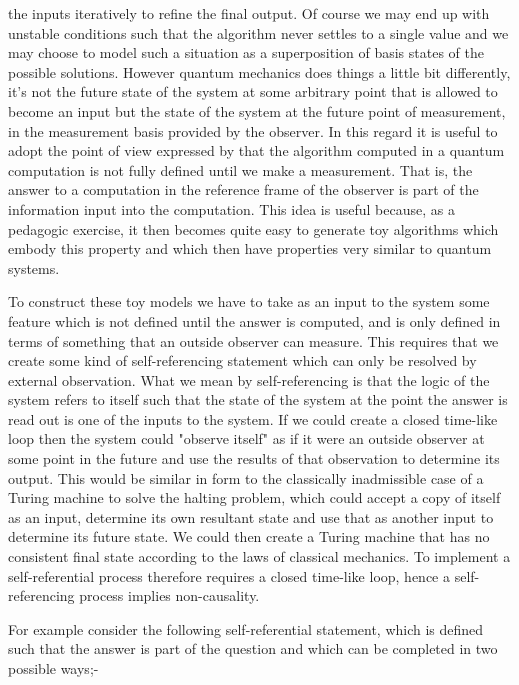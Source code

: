 \documentclass[
   ,final            %
  ]
  {aipproc}
\begin{document}
the inputs iteratively to refine the final output. Of course we may end up with unstable conditions such that the algorithm never settles to a single %
value and we may choose to model such a situation as a superposition of basis states of the possible solutions. However quantum mechanics does things %
a little bit differently, it's not the future state of the system at some arbitrary point that is allowed to become an input but the state of the %
system at the future point of measurement, in the measurement basis provided by the observer. In this regard it is useful to adopt the point of view %
expressed by  \citet*{Castagnoli_finkelstein_2001} that the algorithm computed in a quantum computation is not fully defined until
we make a measurement. That is, the answer to a computation in the reference frame of the observer is part of the information input into the
computation. This idea is useful because, as a pedagogic exercise, it then becomes quite easy to generate toy
algorithms which embody this property and which then have properties very similar to quantum systems.
\par
To construct these toy models we have to take as an input to the system some feature which is not defined until the answer is computed, and is only %
defined in terms of something that an outside observer can measure. This requires that we create some kind of self-referencing statement which can %
only be resolved by external observation. What we mean by self-referencing is that the logic of the system refers to itself such that the state of the %
system at the point the answer is read out is one of the inputs to the system. If we could create a closed time-like loop then the system could %
"observe itself" as if it were an outside observer at some point in the future and use the results of that observation to determine its output. This %
would be similar in form to the classically inadmissible case of a Turing machine to solve the halting problem, which could accept a copy of itself as %
an input, determine its own resultant state and use that as another input to determine its future state. We could then create a Turing machine that %
has no consistent final state according to the laws of classical mechanics. To implement a self-referential process therefore requires a closed %
time-like loop, hence a self-referencing process implies non-causality.
\par
For example consider the following self-referential statement, which is defined such that the answer is part
of the question and which can be completed in two possible ways;-
\end{document}

